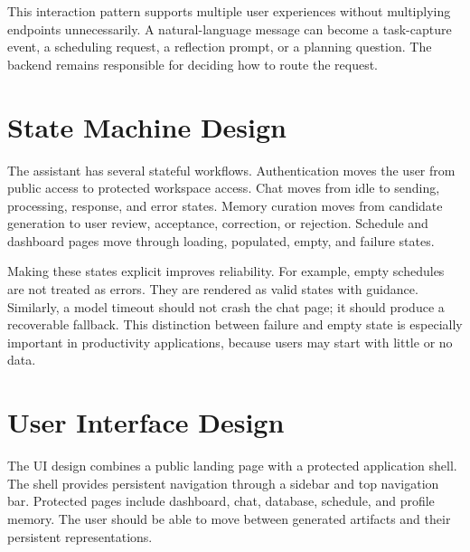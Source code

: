 
This interaction pattern supports multiple user experiences without multiplying endpoints unnecessarily. A natural-language message can become a task-capture event, a scheduling request, a reflection prompt, or a planning question. The backend remains responsible for deciding how to route the request.

\section{State Machine Design}

The assistant has several stateful workflows. Authentication moves the user from public access to protected workspace access. Chat moves from idle to sending, processing, response, and error states. Memory curation moves from candidate generation to user review, acceptance, correction, or rejection. Schedule and dashboard pages move through loading, populated, empty, and failure states.


Making these states explicit improves reliability. For example, empty schedules are not treated as errors. They are rendered as valid states with guidance. Similarly, a model timeout should not crash the chat page; it should produce a recoverable fallback. This distinction between failure and empty state is especially important in productivity applications, because users may start with little or no data.

\section{User Interface Design}

The UI design combines a public landing page with a protected application shell. The shell provides persistent navigation through a sidebar and top navigation bar. Protected pages include dashboard, chat, database, schedule, and profile memory. The user should be able to move between generated artifacts and their persistent representations.


